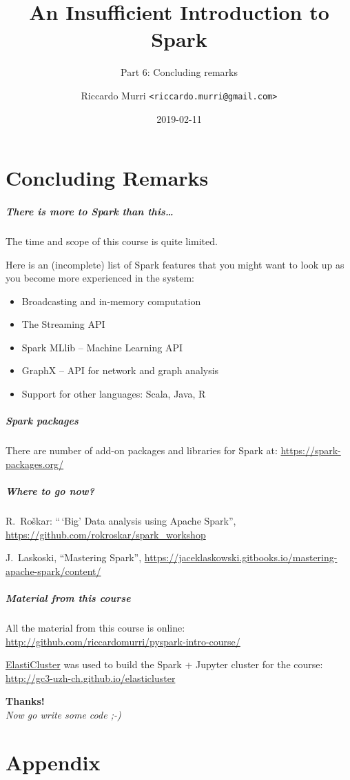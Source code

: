 \documentclass[english,serif,mathserif]{beamer}
\begin{document}
\title[Spark]{An Insufficient Introduction to Spark}
\subtitle{Part 6: Concluding remarks}
\author{Riccardo Murri \texttt{<riccardo.murri@gmail.com>}}
\date{2019-02-11}

\maketitle

\part{Concluding Remarks}

\begin{frame}
  \frametitle{There is more to Spark than this\ldots}

  The time and scope of this course is quite limited.

  \+
  Here is an (incomplete) list of Spark features that you might
  want to look up as you become more experienced in the system:
  \begin{itemize}
  \item Broadcasting and in-memory computation
  \item The Streaming API
  \item Spark MLlib -- Machine Learning API
  \item GraphX -- API for network and graph analysis
  \item Support for other languages: Scala, Java, R
  \end{itemize}
\end{frame}


\begin{frame}
  \frametitle{Spark packages}
  There are number of add-on packages and libraries for Spark at:
  \url{https://spark-packages.org/}
\end{frame}


\begin{frame}
  \frametitle{Where to go now?}

  R.~Roškar: ``\,`Big' Data analysis using Apache Spark'',
  \url{https://github.com/rokroskar/spark_workshop}

  \+ J.~Laskoski, ``Mastering Spark'',
  \url{https://jaceklaskowski.gitbooks.io/mastering-apache-spark/content/}
\end{frame}


\begin{frame}
  \frametitle{Material from this course}
  \small
  All the material from this course is online:
  \url{http://github.com/riccardomurri/pyspark-intro-course/}

  \+
  \href{http://gc3-uzh-ch.github.io/elasticluster}{ElastiCluster}
  was used to build the Spark + Jupyter cluster for the course:
  \url{http://gc3-uzh-ch.github.io/elasticluster}
\end{frame}


\begin{frame}
  \begin{center}
    {\Huge\bfseries Thanks!}
    \\[2em]
    {\large\itshape\color{gray} Now go write some code ;-)}
  \end{center}
\end{frame}


\part{Appendix}
\end{document}
